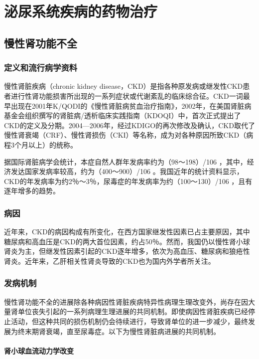 \chapter{泌尿系统疾病的药物治疗}

\section{慢性肾功能不全}

\subsection{定义和流行病学资料}

慢性肾脏疾病（chronic kidney
disease，CKD）是指各种原发病或继发性CKD患者进行性肾功能损害所出现的一系列症状或代谢紊乱的临床综合征。CKD一词最早出现在2001年K/QODI的《慢性肾脏病贫血治疗指南》，2002年，在美国肾脏病基金会组织撰写的肾脏病/透析临床实践指南（KDOQI）中，首次正式提出了CKD的定义及分期。2004---2006年，经过KDIGO的再次修改及确认，CKD取代了慢性肾衰竭（CRF）、慢性肾损伤（CKI）等名称，成为对各种原因所致CKD（病程3个月以上）的统称。

据国际肾脏病学会统计，本症自然人群年发病率约为（98～198）/10{6}
，其中，经济发达国家发病率较高，约为（400～900）/10{6}
。我国近年的统计资料显示，CKD的年发病率为约2％～3％，尿毒症的年发病率为约（100～130）/10{6}
，且有逐年增多的趋势。

\subsection{病因}

近年来，CKD的病因构成有所变化，在西方国家继发性因素已占主要原因，其中糖尿病和高血压是CKD的两大首位因素，约占50％。然而，我国仍以慢性肾小球肾炎为主，但继发性因素引起的CKD逐年增多，依次为高血压、糖尿病和狼疮性肾炎。近年来，乙肝相关性肾炎导致的CKD也为国内外学者所关注。

\subsection{发病机制}

慢性肾功能不全的进展除各种病因性肾脏疾病特异性病理生理改变外，尚存在因大量肾单位丧失引起的一系列病理生理进展的共同机制。即使病因性肾脏疾病已经停止活动，但这种共同的损伤机制仍会待续进行，导致肾单位的进一步减少，最终发展为终末期肾衰竭，直至尿毒症。以下为慢性肾脏病进展的共同机制。

\subsubsection{肾小球血流动力学改变}

